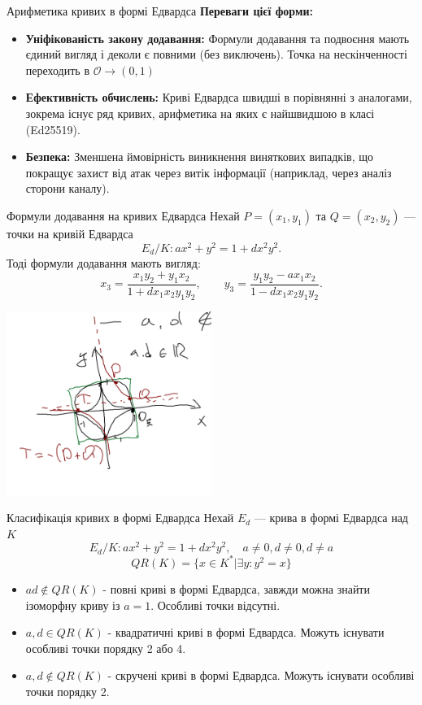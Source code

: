 \documentclass[9pt]{beamer}
\begin{document}
\begin{darkframes}
\begin{frame}{Арифметика кривих в формі Едвардса}
  \textbf{Переваги цієї форми:}
  \begin{itemize}
    \item \textbf{Уніфікованість закону додавання:} Формули додавання та подвоєння мають єдиний вигляд і деколи є повними (без виключень). Точка на нескінченності переходить в $\mathcal{O} \rightarrow (0,1)$
    \item \textbf{Ефективність обчислень:} Криві Едвардса швидші в порівнянні з аналогами, зокрема існує ряд кривих, арифметика на яких є найшвидшою в класі (Ed25519).
    \item \textbf{Безпека:} Зменшена ймовірність виникнення виняткових випадків, що покращує захист від атак через витік інформації (наприклад, через аналіз сторони каналу).
  \end{itemize}
\end{frame}

\begin{frame}{Формули додавання  на кривих Едвардса}
  Нехай \(P=(x_1,y_1)\) та \(Q=(x_2,y_2)\) --- точки на кривій Едвардса
  \[
  E_d/K:a x^2+y^2 = 1+d x^2y^2.
  \]
  Тоді формули додавання мають вигляд:
  \[
  x_3 = \frac{x_1y_2 + y_1x_2}{1+d x_1x_2y_1y_2},\qquad
  y_3 = \frac{y_1y_2 - a x_1x_2}{1-d x_1x_2y_1y_2}.
  \]
\begin{center}
    \includegraphics[width=0.5\textwidth]{resources/ed.png}
    \end{center}

\end{frame}

\begin{frame}{Класифікація кривих в формі Едвардса}
  Нехай \(E_d\) --- крива в формі Едвардса над $K$
  \[
  E_d/K:a x^2 + y^2 = 1 + d x^2 y^2, \quad a \neq 0, d\neq0, d\neq a
  \]
  $$QR(K)=\{x\in K^* | \exists y: y^2=x\}$$
  \begin{itemize}
    \item $ad\notin QR(K)$ - повні криві в формі Едвардса, завжди можна знайти ізоморфну криву із $a=1$. Особливі точки відсутні.
    \item $a,d\in QR(K)$ - квадратичні криві в формі Едвардса. Можуть існувати особливі точки порядку 2 або 4.
    \item $a,d\notin QR(K)$ - скручені криві в формі Едвардса. Можуть існувати особливі точки порядку 2.
  \end{itemize}
  

\end{frame}
\end{darkframes}
\end{document}
